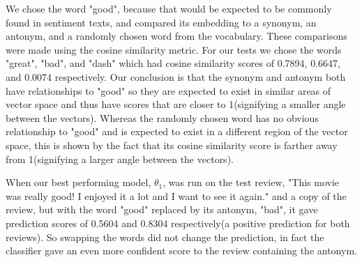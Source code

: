 \documentclass[12pt,notitlepage]{article}
\begin{document}
We chose the word "good", because that would be expected to be commonly found in sentiment texts, and compared its embedding to a synonym, an antonym, and a randomly chosen word from the vocabulary. These comparisons were made using the cosine similarity metric. For our tests we chose the words "great", "bad", and "dash" which had cosine similarity scores of 0.7894, 0.6647, and 0.0074 respectively. Our conclusion is that the synonym and antonym both have relationships to "good" so they are expected to exist in similar areas of vector space and thus have scores that are closer to 1(signifying a smaller angle between the vectors). Whereas the randomly chosen word has no obvious relationship to "good" and is expected to exist in a different region of the vector space, this is shown by the fact that its cosine similarity score is farther away from 1(signifying a larger angle between the vectors). 

When our best performing model, $\theta_{1}$, was run on the test review, "This movie was really good! I enjoyed it a lot and I want to see it again." and a copy of the review, but with the word "good" replaced by its antonym, "bad", it gave prediction scores of 0.5604 and 0.8304 respectively(a positive prediction for both reviews). So swapping the words did not change the prediction, in fact the classifier gave an even more confident score to the review containing the antonym. 
\end{document}
